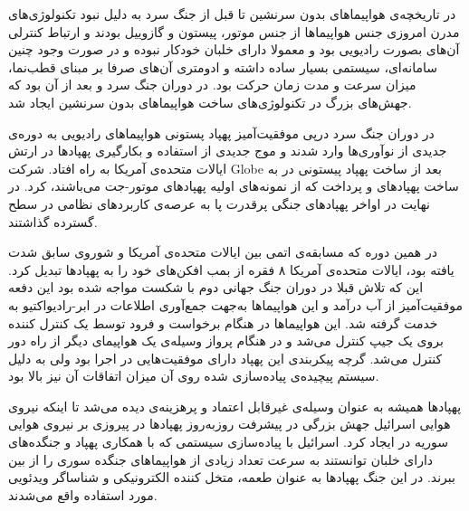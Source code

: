 
در تاریخچه‌ی هواپیماهای بدون سرنشین تا قبل از جنگ سرد به دلیل نبود تکنولوژی‌های مدرن امروزی جنس هواپیماها از جنس موتور، پیستون و گازوییل بودند و ارتباط کنترلی آن‌های بصورت رادیویی بود و معمولا دارای خلبان خودکار نبوده و در صورت وجود چنین سامانه‌ای، سیستمی بسیار ساده داشته و ادومتری آن‌های صرفا بر مبنای قطب‌نما، میزان سرعت و مدت زمان حرکت بود. در دوران جنگ سرد و بعد از آن بود که جهش‌های بزرگ در تکنولوژی‌های ساخت هواپیماهای بدون سرنشین ایجاد شد.

در دوران جنگ سرد درپی موفقیت‌آمیز پهپاد پستونی  هواپیماهای رادیویی به دوره‌ی جدیدی از نوآوری‌ها وارد شدند و موج جدیدی از استفاده و بکارگیری پهپادها در ارتش ایالات متحده‌ی آمریکا به راه افتاد. شرکت Globe بعد از ساخت پهپاد پیستونی  در  به ساخت پهپادهای  و  پرداخت که از نمونه‌های اولیه پهپادهای موتور-جت می‌باشند، کرد. در نهایت در اواخر  پهپادهای جنگی پرقدرت پا به عرصه‌ی کاربردهای نظامی در سطح گسترده گذاشتند.


در همین دوره که مسابقه‌ی اتمی بین ایالات متحده‌ی آمریکا و شوروی سابق شدت یافته بود، ایالات متحده‌ی آمریکا ۸ فقره از بمب افکن‌های  خود را به پهپادها تبدیل کرد. این که تلاش قبلا در دوران جنگ جهانی دوم با شکست مواجه شده بود این دفعه موفقیت‌آمیز از آب درآمد و این هواپیماها به‌جهت جمع‌آوری اطلاعات در ابر-رادیواکتیو به خدمت گرفته شد. این هواپیماها در هنگام برخواست و فرود توسط یک کنترل کننده بروی یک جیپ کنترل می‌شد و در هنگام پرواز وسیله‌‌ی یک هواپیمای  دیگر از راه دور کنترل می‌شد. گرچه پیکربندی این پهپاد دارای موفقیت‌هایی در اجرا بود ولی به دلیل سیستم پیچیده‌ی پیاده‌سازی شده روی آن میزان اتفاقات آن نیز بالا بود.

پهپادها همیشه به عنوان وسیله‌ی غیرقابل اعتماد و پرهزینه‌ی دیده می‌شد تا اینکه نیروی هوایی اسرائیل جهش بزرگی در پیشرفت روزبه‌روز پهپاد‌ها در پیروزی بر نیروی هوایی سوریه در  ایجاد کرد. اسرائیل با پیاده‌سازی سیستمی که با همکاری پهپاد و جنگده‌های دارای خلبان توانستند به سرعت تعداد زیادی از هواپیماهای جنگده سوری را از بین ببرند. در این جنگ پهپادها به عنوان طعمه‌، متخل کننده‌ الکترونیکی و شناساگر ویدئویی مورد استفاده واقع می‌شدند.

